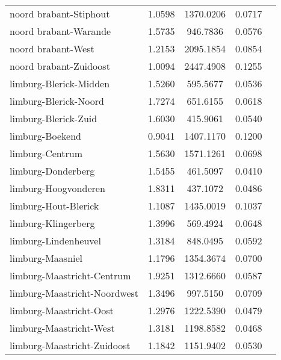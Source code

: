 \begin{longtable}{llccc}
	noord brabant-Stiphout                    & 1.0598  & 1370.0206 & 0.0717                 \\
	noord brabant-Warande                     & 1.5735  & 946.7836  & 0.0576                 \\
	noord brabant-West                        & 1.2153  & 2095.1854 & 0.0854                 \\
	noord brabant-Zuidoost                    & 1.0094  & 2447.4908 & 0.1255                 \\
	limburg-Blerick-Midden                    & 1.5260  & 595.5677  & 0.0536                 \\
	limburg-Blerick-Noord                     & 1.7274  & 651.6155  & 0.0618                 \\
	limburg-Blerick-Zuid                      & 1.6030  & 415.9061  & 0.0540                 \\
	limburg-Boekend                           & 0.9041  & 1407.1170 & 0.1200                 \\
	limburg-Centrum                           & 1.5630  & 1571.1261 & 0.0698                 \\
	limburg-Donderberg                        & 1.5455  & 461.5097  & 0.0410                 \\
	limburg-Hoogvonderen                      & 1.8311  & 437.1072  & 0.0486                 \\
	limburg-Hout-Blerick                      & 1.1087  & 1435.0019 & 0.1037                 \\
	limburg-Klingerberg                       & 1.3996  & 569.4924  & 0.0648                 \\
	limburg-Lindenheuvel                      & 1.3184  & 848.0495  & 0.0592                 \\
	limburg-Maasniel                          & 1.1796  & 1354.3674 & 0.0700                 \\
	limburg-Maastricht-Centrum                & 1.9251  & 1312.6660 & 0.0587                 \\
	limburg-Maastricht-Noordwest              & 1.3496  & 997.5150  & 0.0709                 \\
	limburg-Maastricht-Oost                   & 1.2976  & 1222.5390 & 0.0479                 \\
	limburg-Maastricht-West                   & 1.3181  & 1198.8582 & 0.0468                 \\
	limburg-Maastricht-Zuidoost               & 1.1842  & 1151.9402 & 0.0530                 \\

\end{longtable}
